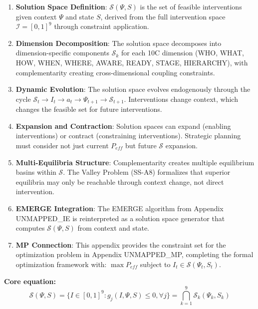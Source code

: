\begin{enumerate}
    \item \textbf{Solution Space Definition}: $\mathcal{S}(\Psi, S)$ is the set of feasible interventions given context $\Psi$ and state $S$, derived from the full intervention space $\mathcal{I} = [0,1]^9$ through constraint application.

    \item \textbf{Dimension Decomposition}: The solution space decomposes into dimension-specific components $\mathcal{S}_k$ for each 10C dimension (WHO, WHAT, HOW, WHEN, WHERE, AWARE, READY, STAGE, HIERARCHY), with complementarity creating cross-dimensional coupling constraints.

    \item \textbf{Dynamic Evolution}: The solution space evolves endogenously through the cycle $\mathcal{S}_t \to I_t \to a_t \to \Psi_{t+1} \to \mathcal{S}_{t+1}$. Interventions change context, which changes the feasible set for future interventions.

    \item \textbf{Expansion and Contraction}: Solution spaces can expand (enabling interventions) or contract (constraining interventions). Strategic planning must consider not just current $P_{eff}$ but future $\mathcal{S}$ expansion.

    \item \textbf{Multi-Equilibria Structure}: Complementarity creates multiple equilibrium basins within $\mathcal{S}$. The Valley Problem (SS-A8) formalizes that superior equilibria may only be reachable through context change, not direct intervention.

    \item \textbf{EMERGE Integration}: The EMERGE algorithm from Appendix UNMAPPED_IE is reinterpreted as a solution space generator that computes $\mathcal{S}(\Psi, S)$ from context and state.

    \item \textbf{MP Connection}: This appendix provides the constraint set for the optimization problem in Appendix UNMAPPED_MP, completing the formal optimization framework with: $\max P_{eff}$ subject to $I_t \in \mathcal{S}(\Psi_t, S_t)$.
\end{enumerate}

\textbf{Core equation:}
\begin{equation}
\mathcal{S}(\Psi, S) = \{I \in [0,1]^9 : g_j(I, \Psi, S) \leq 0, \forall j\} = \bigcap_{k=1}^{9} \mathcal{S}_k(\Psi_k, S_k)
\end{equation}

